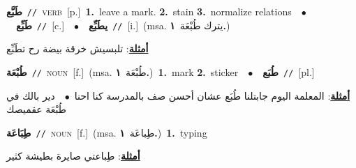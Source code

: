 \documentclass[10pt,a4paper,twoside]{article} %
\begin{document}
\begin{multicols}{2}
{\setlength\topsep{0pt}\textbf{\foreignlanguage{arabic}{طَبَّع}}\ {\color{gray}\texttt{//}\color{black}}\ \textsc{verb}\ [p.]\ \textbf{1.}~leave a mark.  \textbf{2.}~stain  \textbf{3.}~normalize relations\ \ $\bullet$\ \ \setlength\topsep{0pt}\textbf{\foreignlanguage{arabic}{طَبِّع}}\ {\color{gray}\texttt{//}\color{black}}\ [c.]\ \ $\bullet$\ \ \setlength\topsep{0pt}\textbf{\foreignlanguage{arabic}{يطَبِّع}}\ {\color{gray}\texttt{//}\color{black}}\ [i.]\ \color{gray}(msa. \foreignlanguage{arabic}{يترك طُبْعَة}~\foreignlanguage{arabic}{\textbf{١.}})\color{black}\  \begin{flushright}\color{gray}\foreignlanguage{arabic}{\textbf{\underline{\foreignlanguage{arabic}{أمثلة}}}: تلبسيش خرقة بيضة رح تطَبِّع}\end{flushright}\color{black}} \vspace{2mm}

{\setlength\topsep{0pt}\textbf{\foreignlanguage{arabic}{طُبْعَة}}\ {\color{gray}\texttt{//}\color{black}}\ \textsc{noun}\ [f.]\ \color{gray}(msa. \foreignlanguage{arabic}{طُبْعَة}~\foreignlanguage{arabic}{\textbf{١.}})\color{black}\ \textbf{1.}~mark  \textbf{2.}~sticker\ \ $\bullet$\ \ \setlength\topsep{0pt}\textbf{\foreignlanguage{arabic}{طُبَع}}\ {\color{gray}\texttt{//}\color{black}}\ [pl.]\  \begin{flushright}\color{gray}\foreignlanguage{arabic}{\textbf{\underline{\foreignlanguage{arabic}{أمثلة}}}: المعلمة اليوم جابتلنا طُبَع عشان أحسن صف بالمدرسة كنا احنا\ $\bullet$\ \  دير بالك في طُبْعَة عقميصك}\end{flushright}\color{black}} \vspace{2mm}

{\setlength\topsep{0pt}\textbf{\foreignlanguage{arabic}{طِبَاعَة}}\ {\color{gray}\texttt{//}\color{black}}\ \textsc{noun}\ [f.]\ \color{gray}(msa. \foreignlanguage{arabic}{طِباعَة}~\foreignlanguage{arabic}{\textbf{١.}})\color{black}\ \textbf{1.}~typing\  \begin{flushright}\color{gray}\foreignlanguage{arabic}{\textbf{\underline{\foreignlanguage{arabic}{أمثلة}}}: طِباعتي صايرة بطيشة كثير}\end{flushright}\color{black}} \vspace{2mm}


\end{multicols}
\end{document}
